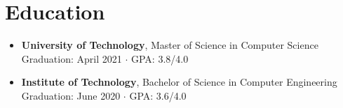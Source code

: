 \documentclass{article}
\begin{document}
\section*{Education}
\begin{itemize}[leftmargin=*]
    \item[]
    {
        \textbf{University of Technology}{, Master of Science in Computer Science} \\
        {Graduation: April 2021 $\cdot$ GPA: 3.8/4.0}
    }
    \item[]
    {
        \textbf{Institute of Technology}{, Bachelor of Science in Computer Engineering} \\
        {Graduation: June 2020 $\cdot$ GPA: 3.6/4.0}
    }
\end{itemize}
\end{document}
